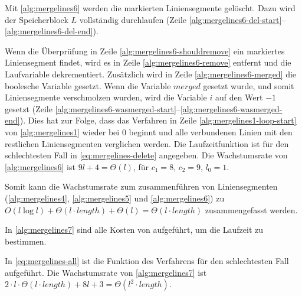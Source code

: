 Mit \autoref{alg:mergelines6} werden die markierten Liniensegmente gelöscht. Dazu wird der Speicherblock $L$
 vollständig durchlaufen (Zeile \ref{alg:mergelines6-del-start}--\ref{alg:mergelines6-del-end}).

Wenn die Überprüfung in Zeile \ref{alg:mergelines6-shouldremove} ein markiertes Liniensegment findet, wird es in Zeile
 \ref{alg:mergelines6-remove} entfernt und die Laufvariable dekrementiert. Zusätzlich wird in Zeile
 \ref{alg:mergelines6-merged} die boolesche Variable gesetzt. Wenn die Variable $\mathit{merged}$ gesetzt wurde, und
 somit Liniensegmente verschmolzen wurden, wird die Variable $i$ auf den Wert $-1$ gesetzt
 (Zeile \ref{alg:mergelines6-wasmerged-start}--\ref{alg:mergelines6-wasmerged-end}). Dies hat zur Folge, dass das
 Verfahren  in Zeile \ref{alg:mergelines1-loop-start} von \autoref{alg:mergelines1} wieder bei $0$
 beginnt und alle verbundenen Linien mit den restlichen Liniensegmenten verglichen werden. Die Laufzeitfunktion ist für
 den schlechtesten Fall in \autoref{eq:mergelines-delete} angegeben. Die Wachstumsrate von \autoref{alg:mergelines6}
 ist $9l + 4 = \Theta(l)$, für $c_{1} = 8$, $c_{2} = 9$, $l_{0} = 1$.

Somit kann die Wachstumsrate zum zusammenführen von Liniensegmenten (\autoref{alg:mergelines4},
 \autoref{alg:mergelines5} und \autoref{alg:mergelines6}) zu
 $O(l \log l) + \Theta(l\cdot\mathit{length}) + \Theta(l) = \Theta(l\cdot\mathit{length})$ zusammengefasst werden.

In \autoref{alg:mergelines7} sind alle Kosten von  aufgeführt, um die Laufzeit zu bestimmen.

In \autoref{eq:mergelines-all} ist die Funktion des Verfahrens für den schlechtesten Fall aufgeführt. Die Wachstumsrate
 von \autoref{alg:mergelines7} ist
 $2 \cdot l \cdot \Theta(l \cdot \mathit{length}) + 8l + 3 = \Theta(l^2 \cdot \mathit{length})$.


